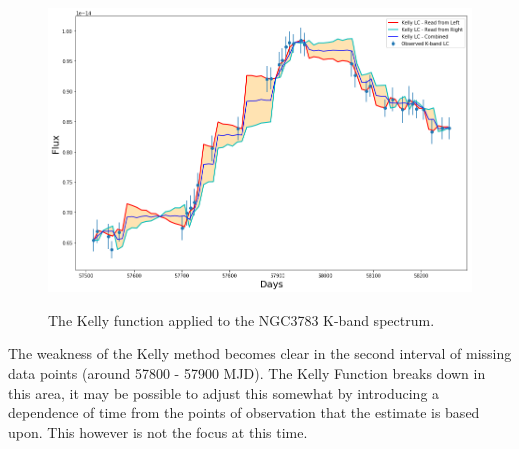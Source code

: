 \documentclass[11pt]{article}
\begin{document}
\begin{figure}[htp!]
\centering
\includegraphics[width=1\linewidth]{Figure/NGC3783K-Kelly.png}\\
\caption{The Kelly function applied to the NGC3783 K-band spectrum.}
\label{fig:NGC3783K-Kelly}
\end{figure}

The weakness of the Kelly method becomes clear in the second interval of missing data points (around 57800 - 57900 MJD). The Kelly Function breaks down in this area, it may be possible to adjust this somewhat by introducing a dependence of time from the points of observation that the estimate is based upon. This however is not the focus at this time. \\
\\
\end{document}
